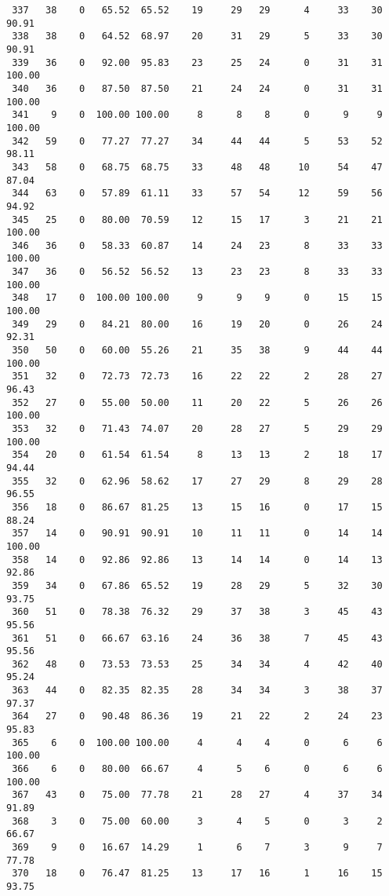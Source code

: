 \begin{verbatim}
 337   38    0   65.52  65.52    19     29   29      4     33    30    90.91
 338   38    0   64.52  68.97    20     31   29      5     33    30    90.91
 339   36    0   92.00  95.83    23     25   24      0     31    31   100.00
 340   36    0   87.50  87.50    21     24   24      0     31    31   100.00
 341    9    0  100.00 100.00     8      8    8      0      9     9   100.00
 342   59    0   77.27  77.27    34     44   44      5     53    52    98.11
 343   58    0   68.75  68.75    33     48   48     10     54    47    87.04
 344   63    0   57.89  61.11    33     57   54     12     59    56    94.92
 345   25    0   80.00  70.59    12     15   17      3     21    21   100.00
 346   36    0   58.33  60.87    14     24   23      8     33    33   100.00
 347   36    0   56.52  56.52    13     23   23      8     33    33   100.00
 348   17    0  100.00 100.00     9      9    9      0     15    15   100.00
 349   29    0   84.21  80.00    16     19   20      0     26    24    92.31
 350   50    0   60.00  55.26    21     35   38      9     44    44   100.00
 351   32    0   72.73  72.73    16     22   22      2     28    27    96.43
 352   27    0   55.00  50.00    11     20   22      5     26    26   100.00
 353   32    0   71.43  74.07    20     28   27      5     29    29   100.00
 354   20    0   61.54  61.54     8     13   13      2     18    17    94.44
 355   32    0   62.96  58.62    17     27   29      8     29    28    96.55
 356   18    0   86.67  81.25    13     15   16      0     17    15    88.24
 357   14    0   90.91  90.91    10     11   11      0     14    14   100.00
 358   14    0   92.86  92.86    13     14   14      0     14    13    92.86
 359   34    0   67.86  65.52    19     28   29      5     32    30    93.75
 360   51    0   78.38  76.32    29     37   38      3     45    43    95.56
 361   51    0   66.67  63.16    24     36   38      7     45    43    95.56
 362   48    0   73.53  73.53    25     34   34      4     42    40    95.24
 363   44    0   82.35  82.35    28     34   34      3     38    37    97.37
 364   27    0   90.48  86.36    19     21   22      2     24    23    95.83
 365    6    0  100.00 100.00     4      4    4      0      6     6   100.00
 366    6    0   80.00  66.67     4      5    6      0      6     6   100.00
 367   43    0   75.00  77.78    21     28   27      4     37    34    91.89
 368    3    0   75.00  60.00     3      4    5      0      3     2    66.67
 369    9    0   16.67  14.29     1      6    7      3      9     7    77.78
 370   18    0   76.47  81.25    13     17   16      1     16    15    93.75

\end{verbatim}
